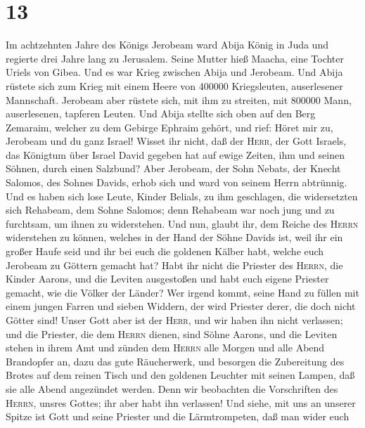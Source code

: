 \hypertarget{section-12}{%
\section{13}\label{section-12}}

 Im achtzehnten Jahre des Königs Jerobeam ward Abija König
in Juda  und regierte drei Jahre lang zu Jerusalem. Seine
Mutter hieß Maacha, eine Tochter Uriels von Gibea. Und es war Krieg
zwischen Abija und Jerobeam.  Und Abija rüstete sich zum
Krieg mit einem Heere von 400000 Kriegsleuten, auserlesener Mannschaft.
Jerobeam aber rüstete sich, mit ihm zu streiten, mit 800000 Mann,
auserlesenen, tapferen Leuten.  Und Abija stellte sich
oben auf den Berg Zemaraim, welcher zu dem Gebirge Ephraim gehört, und
rief: Höret mir zu, Jerobeam und du ganz Israel!  Wisset
ihr nicht, daß der \textsc{Herr}, der Gott Israels, das Königtum über
Israel David gegeben hat auf ewige Zeiten, ihm und seinen Söhnen, durch
einen Salzbund?  Aber Jerobeam, der Sohn Nebats, der
Knecht Salomos, des Sohnes Davids, erhob sich und ward von seinem Herrn
abtrünnig.  Und es haben sich lose Leute, Kinder Belials,
zu ihm geschlagen, die widersetzten sich Rehabeam, dem Sohne Salomos;
denn Rehabeam war noch jung und zu furchtsam, um ihnen zu widerstehen.
 Und nun, glaubt ihr, dem Reiche des \textsc{Herrn}
widerstehen zu können, welches in der Hand der Söhne Davids ist, weil
ihr ein großer Haufe seid und ihr bei euch die goldenen Kälber habt,
welche euch Jerobeam zu Göttern gemacht hat?  Habt ihr
nicht die Priester des \textsc{Herrn}, die Kinder Aarons, und die
Leviten ausgestoßen und habt euch eigene Priester gemacht, wie die
Völker der Länder? Wer irgend kommt, seine Hand zu füllen mit einem
jungen Farren und sieben Widdern, der wird Priester derer, die doch
nicht Götter sind!  Unser Gott aber ist der
\textsc{Herr}, und wir haben ihn nicht verlassen; und die Priester, die
dem \textsc{Herrn} dienen, sind Söhne Aarons, und die Leviten stehen in
ihrem Amt  und zünden dem \textsc{Herrn} alle Morgen und
alle Abend Brandopfer an, dazu das gute Räucherwerk, und besorgen die
Zubereitung des Brotes auf dem reinen Tisch und den goldenen Leuchter
mit seinen Lampen, daß sie alle Abend angezündet werden. Denn wir
beobachten die Vorschriften des \textsc{Herrn}, unsres Gottes; ihr aber
habt ihn verlassen!  Und siehe, mit uns an unserer Spitze
ist Gott und seine Priester und die Lärmtrompeten, daß man wider euch
